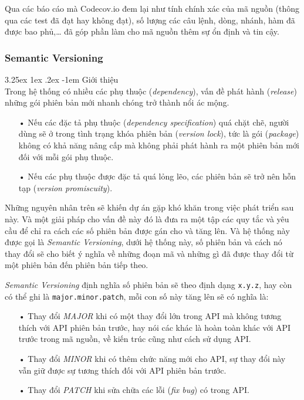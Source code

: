 \documentclass[12pt,a4paper]{article}
\makeatletter
\newcommand{\myparagraph}[1]{\paragraph{#1}\mbox{}\\} %
\renewcommand\paragraph{\@startsection{paragraph}{5}{\z@}%
  {3.25ex \@plus1ex \@minus.2ex}%
  {-1em}%
  {\normalfont\normalsize\bfseries}}
\makeatother
\begin{document}
Qua các báo cáo mà Codecov.io đem lại như tính chính xác của mã nguồn (thông qua các test đã đạt hay không đạt), số lượng các câu lệnh, dòng, nhánh, hàm đã được bao phủ,… đã góp phần làm cho mã nguồn thêm sự ổn định và tin cậy.

\subsubsection{Semantic Versioning}
\myparagraph{Giới thiệu}
Trong hệ thống có nhiều các phụ thuộc (\textit{dependency}), vấn đề phát hành (\textit{release}) những gói phiên bản mới nhanh chóng trở thành nổi ác mộng. 

\begin{itemize}
\item[•] Nếu các đặc tả phụ thuộc (\textit{dependency specification}) quá chặt chẽ, người dùng sẽ ở trong tình trạng khóa phiên bản (\textit{version lock}), tức là gói (\textit{package}) không có khả năng nâng cấp mà không phải phát hành ra một phiên bản mới đối với mỗi gói phụ thuộc.
\item[•] Nếu các phụ thuộc được đặc tả quá lỏng lẽo, các phiên bản sẽ trở nên hỗn tạp (\textit{version promiscuity}).
\end{itemize}

Những nguyên nhân trên sẽ khiến dự án gặp khó khăn trong việc phát triển sau này. Và một giải pháp cho vấn đề này đó là đưa ra một tập các quy tắc và yêu cầu để chỉ ra cách các số phiên bản được gán cho và tăng lên. Và hệ thống này được gọi là \textit{Semantic Versioning}, dưới hệ thống này, số phiên bản và cách nó thay đổi sẽ cho biết ý nghĩa về những đoạn mã và những gì đã được thay đổi từ một phiên bản đến phiên bản tiếp theo.

\textit{Semantic Versioning} định nghĩa số phiên bản sẽ theo định dạng \texttt{x.y.z}, hay còn có thể ghi là \texttt{major.minor.patch}, mỗi con số này tăng lên sẽ có nghĩa là:
\begin{itemize}
\item[•] Thay đổi \textit{MAJOR} khi có một thay đổi lớn trong API mà không tương thích với API phiên bản trước, hay nói các khác là hoàn toàn khác với API trước trong mã nguồn, về kiến trúc cũng như cách sử dụng API.
\item[•] Thay đổi \textit{MINOR} khi có thêm chức năng mới cho API, sự thay đổi này vẫn giữ được sự tương thích đối với API phiên bản trước.
\item[•] Thay đổi \textit{PATCH} khi sửa chữa các lỗi (\textit{fix bug}) có trong API.
\end{itemize}
\end{document}
